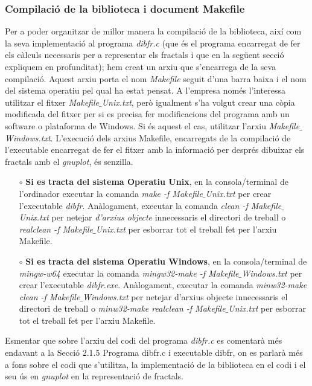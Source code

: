 \documentclass[12pt]{report}
\begin{document}
\subsubsection{Compilació de la biblioteca i document Makefile}
Per a poder organitzar de millor manera la compilació de la biblioteca, així com la seva implementació al programa \textit{dibfr.c} (que és el programa encarregat de fer els càlculs necessaris per a representar els fractals i que en la següent secció expliquem en profunditat); hem creat un arxiu que s'encarrega de la seva compilació.
Aquest arxiu porta el nom \textit{Makefile} seguit d'una barra baixa i el nom del sistema operatiu pel qual ha estat pensat.
\newline
A l'empresa només l'interessa utilitzar el fitxer \textit{Makefile$\_$Unix.txt}, però igualment s'ha volgut crear una còpia modificada del fitxer per si es precisa fer modificacions del programa amb un software o plataforma de Windows. Si és aquest el cas, utilitzar l'arxiu \textit{Makefile$\_$Windows.txt}.
\newline
L'execució dels arxius Makefile, encarregats de la compilació de l'executable encarregat de fer el fitxer amb la informació per després dibuixar els fractals amb el \textit{gnuplot}, és senzilla.
\begin{itemize}
\item [$\circ$] \textbf{Si es tracta del sistema Operatiu Unix}, en la consola/terminal de l'ordinador executar la comanda \textit{make -f Makefile$\_$Unix.txt} per crear l'executable \textit{dibfr}.
\newline
Anàlogament, executar la comanda \textit{clean -f Makefile$\_$Unix.txt} per netejar \textit{d'arxius objecte} innecessaris el directori de treball o \textit{realclean -f Makefile$\_$Unix.txt} per esborrar tot el treball fet per l'arxiu Makefile.
\item [$\circ$] \textbf{Si es tracta del sistema Operatiu Windows}, en la consola/terminal de \textit{mingw-w64} executar la comanda \textit{mingw32-make -f Makefile$\_$Windows.txt} per crear l'executable \textit{dibfr.exe}.
\newline
Anàlogament, executar la comanda \textit{minw32-make clean -f Makefile$\_$Windows.txt} per netejar d'arxius objecte innecessaris el directori de treball o \textit{minw32-make realclean -f Makefile$\_$Unix.txt} per esborrar tot el treball fet per l'arxiu Makefile.
\end{itemize}
Esmentar que sobre l'arxiu del codi del programa \textit{dibfr.c} es comentarà més endavant a la Secció 2.1.5 Programa dibfr.c i executable dibfr, on es parlarà més a fons sobre el codi que s'utilitza, la implementació de la biblioteca en el codi i el seu ús en \textit{gnuplot} en la representació de fractals.
\newpage
\end{document}
